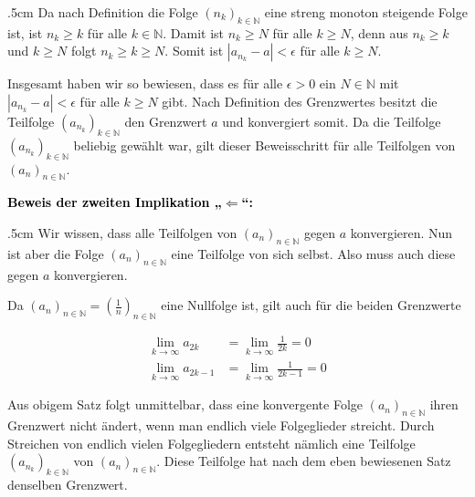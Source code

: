\documentclass[fontsize=9pt,
               parskip=half-,
               DIV=14,
               listof=chapterentry,
               tocflat]{scrbook}
\newenvironment{indentblock}{\begin{adjustwidth}{.5cm}{}}{\end{adjustwidth}}
\newcommand{\proofstep}[1]{\textbf{\textcolor{Black}{#1}}}
\begin{document}
\begin{proof*}
\begin{indentblock}
Da nach Definition die Folge $(n_{k})_{k\in \mathbb {N} }$ eine streng monoton steigende Folge ist, ist $n_{k}\geq k$ für alle $k\in \mathbb {N} $. Damit ist $n_{k}\geq N$ für alle $k\geq N$, denn aus $n_{k}\geq k$ und $k\geq N$ folgt $n_{k}\geq k\geq N$. Somit ist $\left|a_{n_{k}}-a\right|<\epsilon $ für alle $k\geq N$.

Insgesamt haben wir so bewiesen, dass es für alle $\epsilon >0$ ein $N\in \mathbb {N} $ mit $\left|a_{n_{k}}-a\right|<\epsilon $ für alle $k\geq N$ gibt. Nach Definition des Grenzwertes besitzt die Teilfolge $(a_{n_{k}})_{k\in \mathbb {N} }$ den Grenzwert $a$ und konvergiert somit. Da die Teilfolge $\left(a_{n_{k}}\right)_{k\in \mathbb {N} }$ beliebig gewählt war, gilt dieser Beweisschritt für alle Teilfolgen von $(a_{n})_{n\in \mathbb {N} }$.

\end{indentblock}

\proofstep{Beweis der zweiten Implikation „$\Leftarrow $“:}
 \begin{indentblock}
Wir wissen, dass alle Teilfolgen von $(a_{n})_{n\in \mathbb {N} }$ gegen $a$ konvergieren. Nun ist aber die Folge $(a_{n})_{n\in \mathbb {N} }$ eine Teilfolge von sich selbst. Also muss auch diese gegen $a$ konvergieren.

\end{indentblock}

\end{proof*}

\begin{example*}
Da $(a_{n})_{n\in \mathbb {N} }=\left({\tfrac {1}{n}}\right)_{n\in \mathbb {N} }$ eine Nullfolge ist, gilt auch für die beiden Grenzwerte

\begin{align*}
\lim _{k\to \infty }a_{2k}&=\lim _{k\to \infty }{\tfrac {1}{2k}}=0\\\lim _{k\to \infty }a_{2k-1}&=\lim _{k\to \infty }{\tfrac {1}{2k-1}}=0
\end{align*}

\end{example*}

\begin{hint*}
Aus obigem Satz folgt unmittelbar, dass eine konvergente Folge $(a_{n})_{n\in \mathbb {N} }$ ihren Grenzwert nicht ändert, wenn man endlich viele Folgeglieder streicht. Durch Streichen von endlich vielen Folgegliedern entsteht nämlich eine Teilfolge $(a_{n_{k}})_{k\in \mathbb {N} }$ von $(a_{n})_{n\in \mathbb {N} }$. Diese Teilfolge hat nach dem eben bewiesenen Satz denselben Grenzwert.

\end{hint*}
\end{document}

